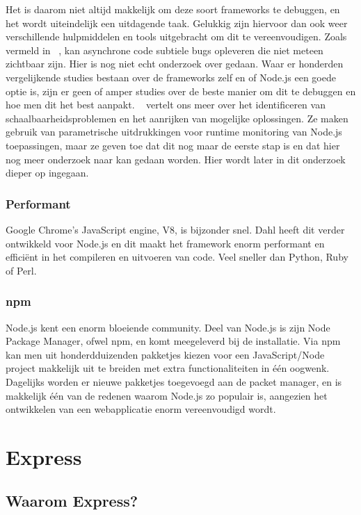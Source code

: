 Het is daarom niet altijd makkelijk om deze soort frameworks te debuggen, en het wordt uiteindelijk een uitdagende taak. Gelukkig zijn hiervoor dan ook weer verschillende hulpmiddelen en tools uitgebracht om dit te vereenvoudigen. Zoals vermeld in ~\autocite{Runtime2017}, kan asynchrone code subtiele bugs opleveren die niet meteen zichtbaar zijn. Hier is nog niet echt onderzoek over gedaan. Waar er honderden vergelijkende studies bestaan over de frameworks zelf en of Node.js een goede optie is, zijn er geen of amper studies over de beste manier om dit te debuggen en hoe men dit het best aanpakt. ~\autocite{Runtime2017} vertelt ons meer over het identificeren van schaalbaarheidsproblemen en het aanrijken van mogelijke oplossingen. Ze maken gebruik van parametrische uitdrukkingen voor runtime monitoring van Node.js toepassingen, maar ze geven toe dat dit nog maar de eerste stap is en dat hier nog meer onderzoek naar kan gedaan worden. Hier wordt later in dit onderzoek dieper op ingegaan.

\subsubsection{Performant}
\label{sec:fast}

Google Chrome's JavaScript engine, V8, is bijzonder snel. Dahl heeft dit verder ontwikkeld voor Node.js en dit maakt het framework enorm performant en efficiënt in het compileren en uitvoeren van code. Veel sneller dan Python, Ruby of Perl.

\subsubsection{npm}
\label{sec:npm}

Node.js kent een enorm bloeiende community. Deel van Node.js is zijn Node Package Manager, ofwel npm, en komt meegeleverd bij de installatie. Via npm kan men uit honderdduizenden pakketjes kiezen voor een JavaScript/Node project makkelijk uit te breiden met extra functionaliteiten in één oogwenk. Dagelijks worden er nieuwe pakketjes toegevoegd aan de packet manager, en is makkelijk één van de redenen waarom Node.js zo populair is, aangezien het ontwikkelen van een webapplicatie enorm vereenvoudigd wordt.   

\section{Express}
\label{sec:express}

\subsection{Waarom Express?}
\label{sec:whyExpress}

